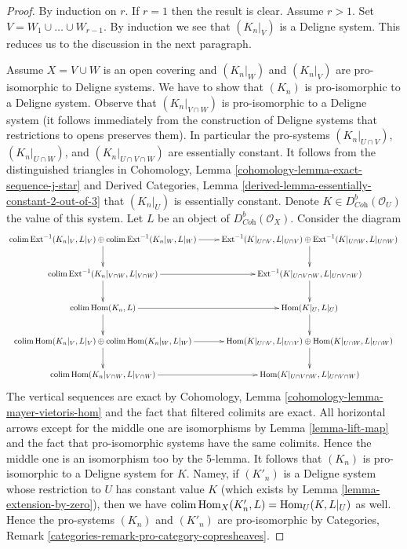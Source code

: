 \begin{proof}
By induction on $r$. If $r = 1$ then the result is clear.
Assume $r > 1$. Set $V = W_1 \cup \ldots \cup W_{r - 1}$.
By induction we see that $(K_n|_V)$ is a Deligne system.
This reduces us to the discussion in the next paragraph.

\medskip\noindent
Assume $X = V \cup W$ is an open covering and
$(K_n|_W)$ and $(K_n|_V)$ are pro-isomorphic to Deligne systems.
We have to show that $(K_n)$ is pro-isomorphic to a Deligne system.
Observe that $(K_n|_{V \cap W})$ is pro-isomorphic to a Deligne system
(it follows immediately from the construction of Deligne systems
that restrictions to opens preserves them). In particular the pro-systems
$(K_n|_{U \cap V})$,
$(K_n|_{U \cap W})$, and
$(K_n|_{U \cap V \cap W})$
are essentially constant. It follows from the distinguished triangles
in Cohomology, Lemma \ref{cohomology-lemma-exact-sequence-j-star} and
Derived Categories, Lemma \ref{derived-lemma-essentially-constant-2-out-of-3}
that $(K_n|_U)$ is essentially constant.
Denote $K \in D^b_{\textit{Coh}}(\mathcal{O}_U)$ the value of this system.
Let $L$ be an object of $D^b_{\textit{Coh}}(\mathcal{O}_X)$.
Consider the diagram
$$
\xymatrix{
\colim \Ext^{-1}(K_n|_V, L|_V) \oplus
\colim \Ext^{-1}(K_n|_W, L|_W) \ar[r] \ar[d] &
\Ext^{-1}(K|_{U \cap V}, L|_{U \cap V}) \oplus
\Ext^{-1}(K|_{U \cap W}, L|_{U \cap W}) \ar[d] \\
\colim \Ext^{-1}(K_n|_{V \cap W}, L|_{V \cap W}) \ar[r] \ar[d] &
\Ext^{-1}(K|_{U \cap V \cap W}, L|_{U \cap V \cap W}) \ar[d] \\
\colim \Hom(K_n, L) \ar[d] \ar[r] &
\Hom(K|_U, L|_U) \ar[d] \\
\colim \Hom(K_n|_V, L|_V) \oplus \colim \Hom(K_n|_W, L|_W) \ar[r] \ar[d] &
\Hom(K|_{U \cap V}, L|_{U \cap V}) \oplus
\Hom(K|_{U \cap W}, L|_{U \cap W}) \ar[d] \\
\colim \Hom(K_n|_{V \cap W}, L|_{V \cap W}) \ar[r] &
\Hom(K|_{U \cap V \cap W}, L|_{U \cap V \cap W})
}
$$
The vertical sequences are exact by
Cohomology, Lemma \ref{cohomology-lemma-mayer-vietoris-hom}
and the fact that filtered colimits are exact.
All horizontal arrows except for the middle one are isomorphisms
by Lemma \ref{lemma-lift-map} and the fact that pro-isomorphic systems
have the same colimits. Hence the middle one is an isomorphism too by
the 5-lemma. It follows that $(K_n)$ is pro-isomorphic to
a Deligne system for $K$. Namey, if $(K'_n)$ is a Deligne system
whose restriction to $U$ has constant value $K$ (which
exists by Lemma \ref{lemma-extension-by-zero}), then
we have $\mathop{\mathrm{colim}}\nolimits \mathop{\mathrm{Hom}}\nolimits_X(K'_n, L) = \mathop{\mathrm{Hom}}\nolimits_U(K, L|_U)$ as well.
Hence the pro-systems $(K_n)$ and $(K'_n)$ are
pro-isomorphic by
Categories, Remark \ref{categories-remark-pro-category-copresheaves}.
\end{proof}

